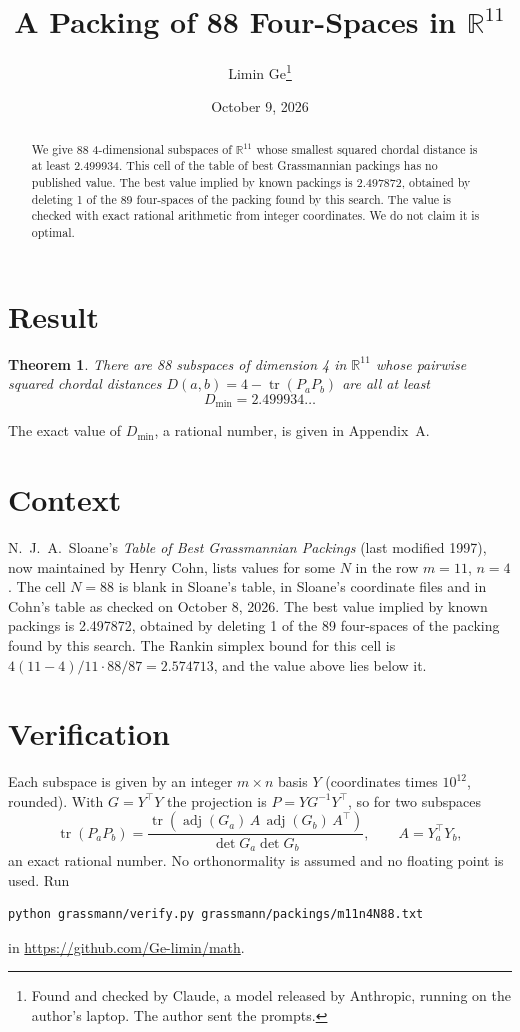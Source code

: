 \documentclass[11pt,a4paper]{article}
\title{A Packing of 88 Four-Spaces in $\mathbb{R}^{11}$}
\author{Limin Ge\thanks{Found and checked by Claude, a model released by Anthropic, running on the author's laptop. The author sent the prompts.}}
\date{October 9, 2026}
\newtheorem*{theorem}{Theorem}
\begin{document}
\maketitle
\begin{abstract}
We give 88 4-dimensional subspaces of $\mathbb{R}^{11}$ whose smallest squared chordal distance is at least 2.499934. This cell of the table of best Grassmannian packings has no published value. The best value implied by known packings is 2.497872, obtained by deleting 1 of the 89 four-spaces of the packing found by this search. The value is checked with exact rational arithmetic from integer coordinates. We do not claim it is optimal.
\end{abstract}

\section{Result}
\begin{theorem}
There are 88 subspaces of dimension 4 in $\mathbb{R}^{11}$ whose pairwise squared chordal distances $D(a,b) = 4 - \operatorname{tr}(P_aP_b)$ are all at least
\[ D_{\min} = 2.499934\ldots \]
\end{theorem}
The exact value of $D_{\min}$, a rational number, is given in Appendix~A.


\section{Context}
N.~J.~A.~Sloane's \emph{Table of Best Grassmannian Packings} (last modified 1997), now maintained by Henry Cohn, lists values for some $N$ in the row $m=11$, $n=4$. The cell $N=88$ is blank in Sloane's table, in Sloane's coordinate files and in Cohn's table as checked on October 8, 2026. The best value implied by known packings is 2.497872, obtained by deleting 1 of the 89 four-spaces of the packing found by this search. The Rankin simplex bound for this cell is $4(11-4)/11\cdot 88/87 = 2.574713$, and the value above lies below it.


\section{Verification}
Each subspace is given by an integer $m\times n$ basis $Y$ (coordinates times $10^{12}$, rounded). With $G=Y^\top Y$ the projection is $P=YG^{-1}Y^\top$, so for two subspaces
\[ \operatorname{tr}(P_aP_b)=\frac{\operatorname{tr}(\operatorname{adj}(G_a)\,A\,\operatorname{adj}(G_b)\,A^\top)}{\det G_a\det G_b},\qquad A=Y_a^\top Y_b, \]
an exact rational number. No orthonormality is assumed and no floating point is used. Run
\begin{verbatim}
python grassmann/verify.py grassmann/packings/m11n4N88.txt
\end{verbatim}
in \url{https://github.com/Ge-limin/math}.
\end{document}
